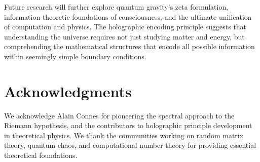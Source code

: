 \documentclass[12pt]{article}
\begin{document}
Future research will further explore quantum gravity's zeta formulation, information-theoretic foundations of consciousness, and the ultimate unification of computation and physics. The holographic encoding principle suggests that understanding the universe requires not just studying matter and energy, but comprehending the mathematical structures that encode all possible information within seemingly simple boundary conditions.

\section*{Acknowledgments}

We acknowledge Alain Connes for pioneering the spectral approach to the Riemann hypothesis, and the contributors to holographic principle development in theoretical physics. We thank the communities working on random matrix theory, quantum chaos, and computational number theory for providing essential theoretical foundations.
\end{document}

